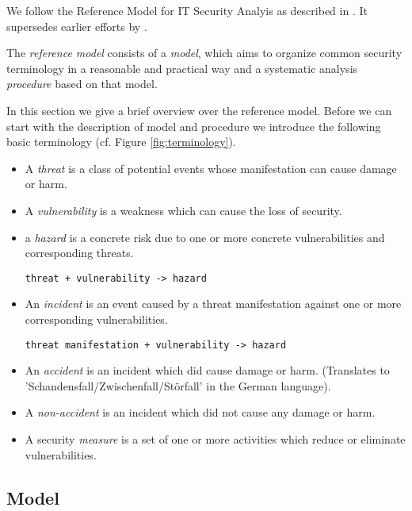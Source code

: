 We follow the Reference Model for IT Security Analyis as described in \cite{Grimm}.
It supersedes earlier efforts by \cite{Avizienis}.

The \emph{reference model} consists of a \emph{model}, which aims to organize common security terminology in a reasonable and practical way and a systematic analysis \emph{procedure} based on that model.

In this section we give a brief overview over the reference model.
Before we can start with the description of model and procedure we introduce the following basic terminology (cf. Figure \ref{fig:terminology}).



\begin{itemize}

\item A \emph{threat} is a class of potential events whose manifestation can
cause damage or harm.

\item A \emph{vulnerability} is a weakness which can cause the loss of security.

\item a \emph{hazard} is a concrete risk due to one or more concrete vulnerabilities and corresponding threats.

\texttt{threat + vulnerability -\textgreater{} hazard}

\item An \emph{incident} is an event caused by a threat manifestation against one or more
corresponding vulnerabilities.

\texttt{threat manifestation + vulnerability -\textgreater{} hazard}

\item An \emph{accident} is an incident which did cause damage or harm. (Translates to 'Schandensfall/Zwischenfall/Störfall' in the German language).

\item A \emph {non-accident} is an incident which did not cause any damage or harm.

\item A security \emph{measure} is a set of one or more activities which reduce or eliminate
vulnerabilities.

\end{itemize}

\subsection{Model}

